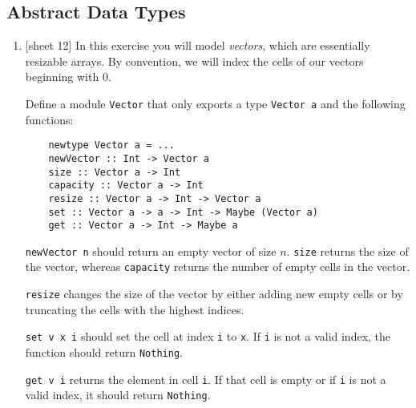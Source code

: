 \documentclass{article}
\def\code#1{\texttt{#1}}
\begin{document}
\subsection{Abstract Data Types}
\begin{enumerate}
    \item {[sheet 12]} In this exercise you will model \textit{vectors}, which are essentially resizable arrays. By convention, we will index the cells of our vectors beginning with $0$. \par
        Define a module \code{Vector} that only exports a type \code{Vector a} and the following functions:
        \begin{verbatim}
    newtype Vector a = ...
    newVector :: Int -> Vector a
    size :: Vector a -> Int
    capacity :: Vector a -> Int
    resize :: Vector a -> Int -> Vector a
    set :: Vector a -> a -> Int -> Maybe (Vector a)
    get :: Vector a -> Int -> Maybe a
        \end{verbatim}
        \code{newVector n} should return an empty vector of size $n$. \code{size} returns the size of the vector, whereas \code{capacity} returns the number of empty cells in the vector. \par
        \code{resize} changes the size of the vector by either adding new empty cells or by truncating the cells with the highest indices. \par
        \code{set v x i} should set the cell at index \code{i} to \code{x}. If \code{i} is not a valid index, the function should return \code{Nothing}. \par
        \code{get v i} returns the element in cell \code{i}. If that cell is empty or if \code{i} is not a valid index, it should return \code{Nothing}.
\end{enumerate}
\end{document}
